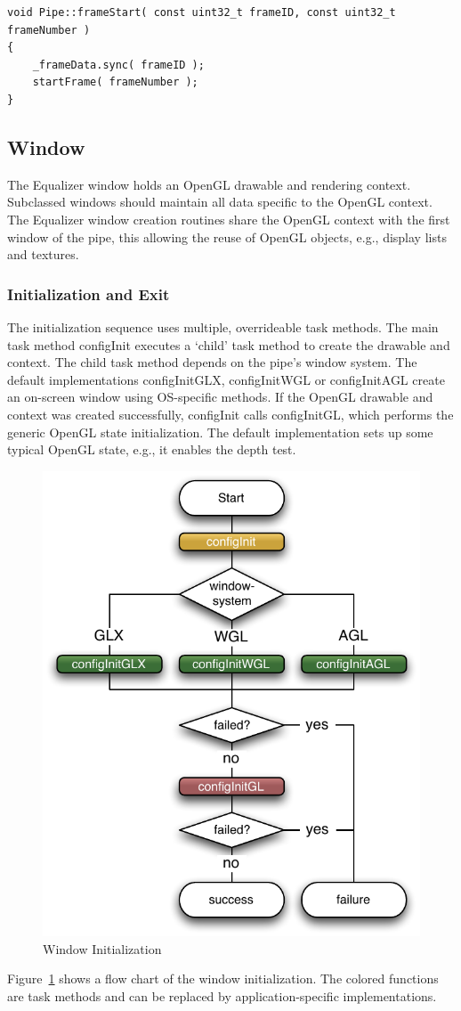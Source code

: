 \documentclass[10pt,a4]{scrartcl}
\newcommand{\fig}[1]{Figure~\ref{#1}}
\begin{document}
{\footnotesize\begin{lstlisting}
void Pipe::frameStart( const uint32_t frameID, const uint32_t frameNumber )
{
    _frameData.sync( frameID );
    startFrame( frameNumber );
}
\end{lstlisting}}


\subsection{Window}

The Equalizer window holds an OpenGL drawable and rendering
context. Subclassed windows should maintain all data specific to the
OpenGL context. The Equalizer window creation routines share the OpenGL
context with the first window of the pipe, this allowing the reuse of
OpenGL objects, e.g., display lists and textures.

\subsubsection{Initialization and Exit}

The initialization sequence uses multiple, overrideable task
methods. The main task method \textsf{configInit} executes a `child'
task method to create the drawable and context. The child task method
depends on the pipe's window system. The default implementations
\textsf{configInitGLX}, \textsf{configInitWGL} or \textsf{configInitAGL}
create an on-screen window using OS-specific methods. If the OpenGL
drawable and context was created successfully, \textsf{configInit} calls
\textsf{configInitGL}, which performs the generic OpenGL state
initialization. The default implementation sets up some typical OpenGL
state, e.g., it enables the depth test.

\begin{figure}
  \includegraphics[width=.4\textwidth]{images/windowInit.pdf}
  {\caption{\small\label{fWindowInit}Window Initialization}}
\end{figure}
\fig{fWindowInit} shows a flow chart of the window initialization. The
colored functions are task methods and can be replaced by
application-specific implementations.
\end{document}
